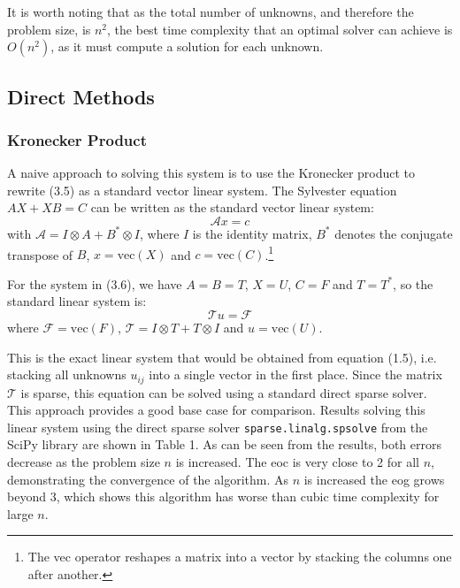 \documentclass{article}
\numberwithin{equation}{section}
\begin{document}
It is worth noting that as the total number of unknowns, and therefore the problem size, is $n^2$, the best time complexity that an optimal solver can achieve is $O(n^2)$, as it must compute a solution for each unknown. 

\subsection{Direct Methods}

\subsubsection{Kronecker Product}
A naive approach to solving this system is to use the Kronecker product to rewrite (3.5) as a standard vector linear system. The Sylvester equation $AX + XB = C$ can be written as the standard vector linear system:
\begin{equation}
\mathcal{A}x = c
\end{equation}
with $\mathcal{A} = I \otimes A + B^* \otimes I$, where $I$ is the identity matrix, $B^*$ denotes the conjugate transpose of $B$, $x = \text{vec}(X)$ and $c = \text{vec}(C)$.\footnote{The vec operator reshapes a matrix into a vector by stacking the columns one after another.}

For the system in (3.6), we have $A=B=T$, $X=U$, $C=F$ and $T=T^*$, so the standard linear system is:
\begin{equation}
\mathcal{T}u = \mathcal{F}
\end{equation}
where $\mathcal{F} = \text{vec}(F)$, $\mathcal{T} = I \otimes T + T \otimes I$ and $u = \text{vec}(U)$. 

This is the exact linear system that would be obtained from equation (1.5), i.e. stacking all unknowns $u_{ij}$ into a single vector in the first place. Since the matrix $\mathcal{T}$ is sparse, this equation can be solved using a standard direct sparse solver. This approach provides a good base case for comparison. Results solving this linear system using the direct sparse solver \texttt{sparse.linalg.spsolve} from the SciPy library are shown in Table 1. As can be seen from the results, both errors decrease as the problem size $n$ is increased. The eoc is very close to 2 for all $n$, demonstrating the convergence of the algorithm. As $n$ is increased the eog grows beyond $3$, which shows this algorithm has worse than cubic time complexity for large $n$. 
\end{document}
